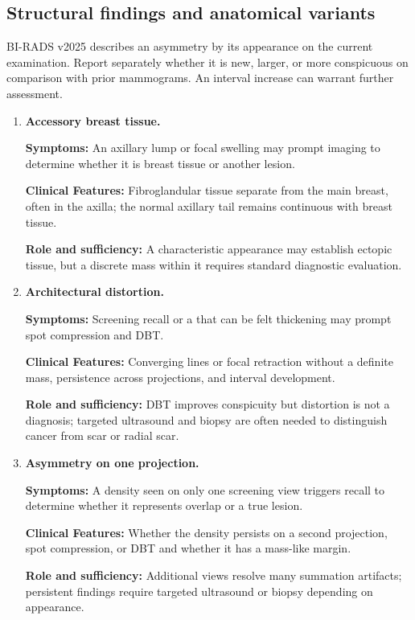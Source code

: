 \subsection{Structural findings and anatomical variants}
BI-RADS v2025 describes an asymmetry by its appearance on the current examination. Report separately whether it is new, larger, or more conspicuous on comparison with prior mammograms. An interval increase can warrant further assessment.
\begin{enumerate}[leftmargin=*,itemsep=0.45em,topsep=0.4em]
\item \textbf{Accessory breast tissue.}\par\noindent\textbf{Symptoms:} An axillary lump or focal swelling may prompt imaging to determine whether it is breast tissue or another lesion.\par\noindent\textbf{Clinical Features:} Fibroglandular tissue separate from the main breast, often in the axilla; the normal axillary tail remains continuous with breast tissue.\par\noindent\textbf{Role and sufficiency:} A characteristic appearance may establish ectopic tissue, but a discrete mass within it requires standard diagnostic evaluation.
\item \textbf{Architectural distortion.}\par\noindent\textbf{Symptoms:} Screening recall or a that can be felt thickening may prompt spot compression and DBT.\par\noindent\textbf{Clinical Features:} Converging lines or focal retraction without a definite mass, persistence across projections, and interval development.\par\noindent\textbf{Role and sufficiency:} DBT improves conspicuity but distortion is not a diagnosis; targeted ultrasound and biopsy are often needed to distinguish cancer from scar or radial scar.
\item \textbf{Asymmetry on one projection.}\par\noindent\textbf{Symptoms:} A density seen on only one screening view triggers recall to determine whether it represents overlap or a true lesion.\par\noindent\textbf{Clinical Features:} Whether the density persists on a second projection, spot compression, or DBT and whether it has a mass-like margin.\par\noindent\textbf{Role and sufficiency:} Additional views resolve many summation artifacts; persistent findings require targeted ultrasound or biopsy depending on appearance.

\end{enumerate}

